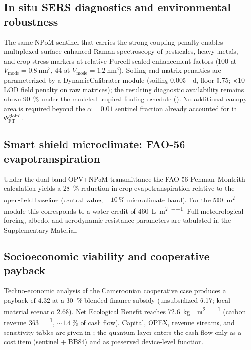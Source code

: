\documentclass[preprint,12pt]{elsarticle}
\begin{document}
\subsection{In situ SERS diagnostics and environmental robustness}
The same NPoM sentinel that carries the strong-coupling penalty enables multiplexed surface-enhanced Raman spectroscopy of pesticides, heavy metals, and crop-stress markers at relative Purcell-scaled enhancement factors (\num{100} at $V_{\mathrm{mode}} = \qty{0.8}{\nm\cubed}$, \num{44} at $V_{\mathrm{mode}} = \qty{1.2}{\nm\cubed}$). Soiling and matrix penalties are parameterized by a DynamicCalibrator module (soiling \qty{0.005}{\per\day}, floor \num{0.75}; $\times 10$ LOD field penalty on raw matrices); the resulting diagnostic availability remains above \qty{90}{\percent} under the modeled tropical fouling schedule (). No additional canopy area is required beyond the $\alpha=0.01$ sentinel fraction already accounted for in $\Phi_{\mathrm{FT}}^{\mathrm{global}}$.

\subsection{Smart shield microclimate: FAO-56 evapotranspiration}
Under the dual-band OPV+NPoM transmittance the FAO-56 Penman--Monteith calculation yields a \qty{28}{\percent} reduction in crop evapotranspiration relative to the open-field baseline (central value; $\pm\qty{10}{\percent}$ microclimate band). For the \qty{500}{\m\squared} module this corresponds to a water credit of \qty{460}{\L\per\m\squared\per\yr}. Full meteorological forcing, albedo, and aerodynamic resistance parameters are tabulated in the Supplementary Material.

\subsection{Socioeconomic viability and cooperative payback}
Techno-economic analysis of the Cameroonian cooperative case produces a payback of \qty{4.32}{\yr} at a \qty{30}{\percent} blended-finance subsidy (unsubsidized \qty{6.17}{\yr}; local-material scenario \qty{2.68}{\yr}). Net Ecological Benefit reaches \qty{72.6}{\kg{}\per\m\squared\per\yr} (carbon revenue \qty{363}{\USD\per\yr}, $\sim\qty{1.4}{\percent}$ of cash flow). Capital, OPEX, revenue streams, and sensitivity tables are given in ; the quantum layer enters the cash-flow only as a cost item (sentinel + BB84) and as preserved device-level function.
\end{document}
